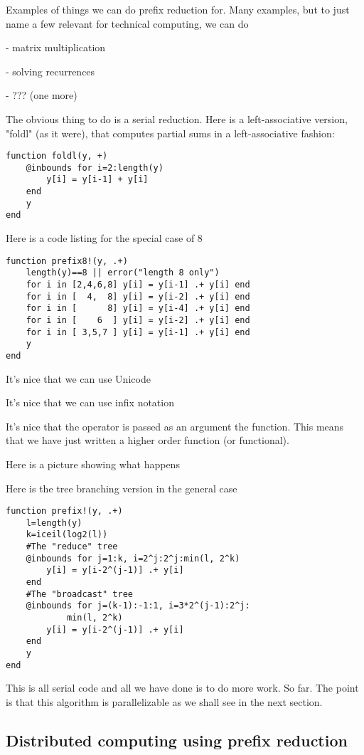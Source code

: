 \documentclass{sig-alternate}
\begin{document}
Examples of things we can do prefix reduction for. Many examples, but to just name a few relevant for technical computing, we can do 

- matrix multiplication

- solving recurrences

- ??? (one more)

The obvious thing to do is a serial reduction. Here is a left-associative version, "foldl" (as it were), that computes partial sums in a left-associative fashion:

\begin{verbatim}
function foldl(y, +)
    @inbounds for i=2:length(y)
        y[i] = y[i-1] + y[i]
    end
    y
end
\end{verbatim}

Here is a code listing for the special case of 8

\begin{verbatim}
function prefix8!(y, .+)
    length(y)==8 || error("length 8 only")
    for i in [2,4,6,8] y[i] = y[i-1] .+ y[i] end
    for i in [  4,  8] y[i] = y[i-2] .+ y[i] end
    for i in [      8] y[i] = y[i-4] .+ y[i] end
    for i in [    6  ] y[i] = y[i-2] .+ y[i] end
    for i in [ 3,5,7 ] y[i] = y[i-1] .+ y[i] end
    y
end
\end{verbatim}

It's nice that we can use Unicode

It's nice that we can use infix notation

It's nice that the operator is passed as an argument the function. This means that we have just written a higher order function (or functional).

Here is a picture showing what happens

Here is the tree branching version in the general case

\begin{verbatim}
function prefix!(y, .+)
    l=length(y)
    k=iceil(log2(l))
    #The "reduce" tree
    @inbounds for j=1:k, i=2^j:2^j:min(l, 2^k)
        y[i] = y[i-2^(j-1)] .+ y[i]
    end
    #The "broadcast" tree
    @inbounds for j=(k-1):-1:1, i=3*2^(j-1):2^j:
            min(l, 2^k)
        y[i] = y[i-2^(j-1)] .+ y[i]
    end
    y
end
\end{verbatim}

This is all serial code and all we have done is to do more work. So far. The point is that this algorithm is parallelizable as we shall see in the next section.

\subsection{Distributed computing using prefix reduction}
\end{document}
